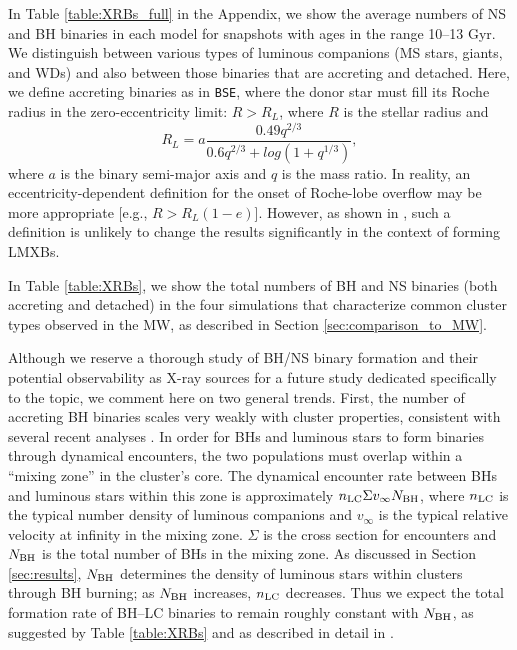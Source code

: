 \documentclass[twocolumn,tighten]{aastex63}
\begin{document}
In Table \ref{table:XRBs_full} in the Appendix, we show the average numbers of NS and BH binaries in each model for snapshots with ages in the range 10--13 Gyr. We distinguish between various types of luminous companions (MS stars, giants, and WDs) and also between those binaries that are accreting and detached. Here, we define accreting binaries as in \texttt{BSE}, where the donor star must fill its Roche radius in the zero-eccentricity limit: $R > R_L$, where $R$ is the stellar radius and
\begin{equation}
\label{eq:RL}
R_L = a\frac{0.49q^{2/3}}{0.6q^{2/3}+log(1+q^{1/3})},
\end{equation}
where $a$ is the binary semi-major axis and $q$ is the mass ratio. In reality, an eccentricity-dependent definition for the onset of Roche-lobe overflow may be more appropriate [e.g., $R > R_L(1-e)$]. However, as shown in \citet{Kremer2018a}, such a definition is unlikely to change the results significantly in the context of forming LMXBs.

In Table \ref{table:XRBs}, we show the total numbers of BH and NS binaries (both accreting and detached) in the four simulations that characterize common cluster types observed in the MW, as described in Section \ref{sec:comparison_to_MW}.

Although we reserve a thorough study of BH/NS binary formation and their potential observability as X-ray sources for a future study dedicated specifically to the topic, we comment here on two general trends. First, the number of accreting BH binaries scales very weakly with cluster properties, consistent with several recent analyses \citep[e.g.,][]{Chatterjee2017b,Kremer2018a}. In order for BHs and luminous stars to form binaries through dynamical encounters, the two populations must overlap within a ``mixing zone'' in the cluster's core. The dynamical encounter rate between BHs and luminous stars within this zone is approximately $n_{\rm{LC}} \Sigma v_\infty N_{\rm{BH}}$, where $n_{\rm{LC}}$ is the typical number density of luminous companions and $v_\infty$ is the typical relative velocity at infinity in the mixing zone. $\Sigma$ is the cross section for encounters and $N_{\rm{BH}}$ is the total number of BHs in the mixing zone. As discussed in Section \ref{sec:results}, $N_{\rm{BH}}$ determines the density of luminous stars within clusters through BH burning; as $N_{\rm{BH}}$ increases, $n_{\rm{LC}}$ decreases. Thus we expect the total formation rate of BH--LC  binaries to remain roughly constant with $N_{\rm{BH}}$, as suggested by Table \ref{table:XRBs} and as described in detail in \citet{Kremer2018a}.
\end{document}
